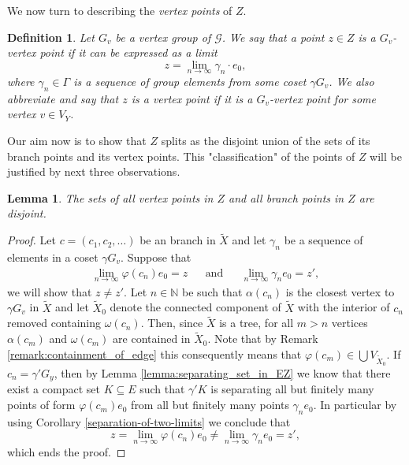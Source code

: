 \documentclass[12pt, a4paper]{article}
\newcommand{\NN}{\mathbb{N}} \newcommand{\ZZ}{\mathbb{Z}}
\newcommand{\8}{\infty}
\theoremstyle{break}
\newtheorem{lm}[thm]{Lemma}
\theoremstyle{defbreak}
\newtheorem{df}[thm]{Definition}
\newcommand{\wtl}[1]{\widetilde{#1}}
\begin{document}
We now turn to describing the {\it vertex points} of $Z$.
\medskip

\begin{df}\label{def:vertex_point}
    Let $G_v$ be a vertex group of $\mathcal{G}$. We say that a point $z\in Z$ is a \textit{$G_v$-vertex point} if it can be expressed as a limit
    $$z = \lim_{n\to\8}\gamma_n\cdot e_0,$$
    where $\gamma_n \in \Gamma$ is a sequence of group elements from some coset $\gamma G_v$. We also abbreviate and say that $z$ is a \textit{vertex point} if it is a $G_v$-vertex point for some vertex $v\in V_Y$.
\end{df}

Our aim now is to show that $Z$ splits as the disjoint union of the sets of its branch points and its vertex points.
This "classification" of the points of $Z$ will be justified by next three observations.
\medskip

\begin{lm}\label{lemma:vertex_and_branch_points_are_disjoint}
The sets of all vertex points in $Z$ and all branch points in $Z$ are disjoint.
\end{lm}

\begin{proof}
    Let $c = (c_1, c_2, \ldots)$ be an branch in $\wtl{X}$ and let $\gamma_n$ be a sequence of elements in a coset $\gamma G_v$. Suppose that 
    \begin{align*}
        \lim_{n\to\8}\varphi(c_n)e_0 = z &&\text{and} && \lim_{n\to\8} \gamma_ne_0 = z',
    \end{align*}
    we will show that $z\neq z'$. Let $n\in \NN$ be such that $\alpha(c_n)$ is the closest vertex to $\gamma G_v$ in $\wtl{X}$ and let $\wtl{X}_0$ denote the connected component of $\wtl{X}$ with the interior of $c_n$ removed containing $\omega(c_n)$. Then, since $\wtl{X}$ is a tree, for all $m> n$ vertices $\alpha(c_m)$ and $\omega(c_m)$ are contained in $\wtl{X}_0$. Note that by Remark \ref{remark:containment_of_edge} this consequently means that $\varphi(c_m)\in \bigcup V_{\wtl{X}_0}$. If $c_n = \gamma'G_y$, then by Lemma \ref{lemma:separating_set_in_EZ} we know that there exist a compact set $K\subseteq E$ such that $\gamma'K$ is separating all but finitely many points of form $\varphi(c_m)e_0$ from all but finitely many points $\gamma_ne_0$. In particular by using Corollary \ref{separation-of-two-limits} we conclude that
    $$z = \lim_{n\to\8}\varphi(c_n)e_0 \neq \lim_{n\to\8} \gamma_ne_0 = z',$$
    which ends the proof.
\end{proof}
\end{document}
